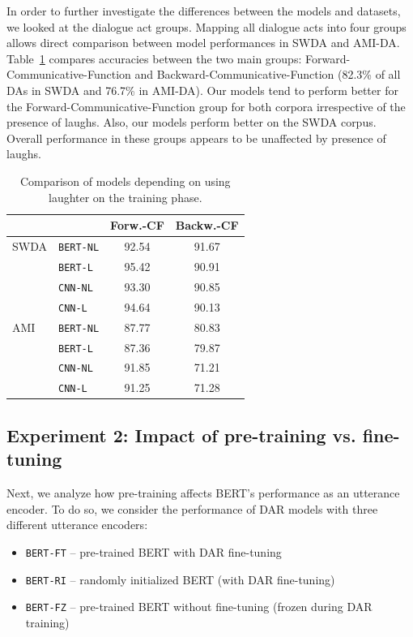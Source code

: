 \documentclass[11pt,a4paper]{article}
\begin{document}
In order to further investigate the differences between the models and datasets, we looked at the dialogue act groups.
Mapping all dialogue acts into four groups allows direct comparison between model performances in SWDA and AMI-DA.
Table~\ref{table:laughter-group-acc} compares accuracies between the two main groups: Forward-Communicative-Function and Backward-Communicative-Function (82.3\% of all DAs in SWDA and 76.7\% in AMI-DA).
Our models tend to perform better for the Forward-Communicative-Function group for both corpora irrespective of the presence of laughs.
Also, our models perform better on the SWDA corpus.
Overall performance in these groups appears to be unaffected by presence of laughs.

\begin{table}
  \centering
  \begin{tabular}{@{}llcc@{}}
    \toprule
    &                  & Forw.-CF  & Backw.-CF   \\ \midrule
    SWDA &\texttt{BERT-NL}  & 92.54 & 91.67       \\ 
         &\texttt{BERT-L}   & 95.42 & 90.91       \\ 
         &\texttt{CNN-NL}   & 93.30 & 90.85        \\
         &\texttt{CNN-L}    & 94.64 & 90.13        \\ \midrule
    AMI  &\texttt{BERT-NL}  & 87.77 & 80.83       \\ 
         &\texttt{BERT-L}   & 87.36 & 79.87       \\
         &\texttt{CNN-NL}   & 91.85 & 71.21        \\
         &\texttt{CNN-L}    & 91.25 & 71.28        \\    \bottomrule
  \end{tabular}
  \caption{Comparison of models depending on using laughter on the training phase. }
  \label{table:laughter-group-acc}
\end{table}



  

%

\subsection{Experiment 2: Impact of pre-training vs. fine-tuning} \label{sec:experiment2} %
Next, we analyze how pre-training affects BERT's performance as an utterance encoder.
To do so, we consider the performance of DAR models with three different utterance encoders:
\begin{itemize}
  \item \texttt{BERT-FT} -- pre-trained BERT with DAR fine-tuning 
  \item \texttt{BERT-RI} -- randomly initialized BERT (with DAR fine-tuning)
  \item \texttt{BERT-FZ} -- pre-trained BERT without fine-tuning (frozen during DAR training)
\end{itemize}
\end{document}
